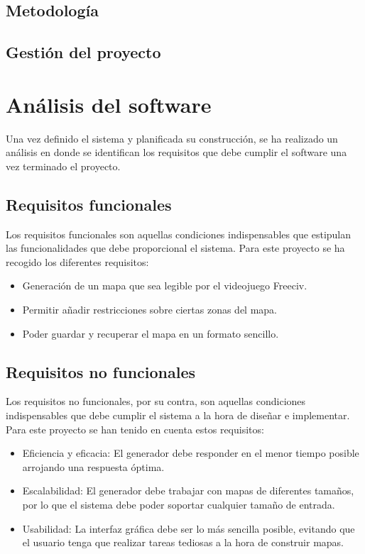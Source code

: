 \subsection{Metodología}

\subsection{Gestión del proyecto}

\section{Análisis del software}

Una vez definido el sistema y planificada su construcción, se ha realizado un análisis en donde se identifican los requisitos que debe cumplir el software una vez terminado el proyecto.

\subsection{Requisitos funcionales}

Los requisitos funcionales son aquellas condiciones indispensables que estipulan las funcionalidades que debe proporcional el sistema. Para este proyecto se ha recogido los diferentes requisitos:

\begin{itemize}
	\item Generación de un mapa que sea legible por el videojuego Freeciv.
	\item Permitir añadir restricciones sobre ciertas zonas del mapa.
	\item Poder guardar y recuperar el mapa en un formato sencillo.
\end{itemize}

\subsection{Requisitos no funcionales}

Los requisitos no funcionales, por su contra, son aquellas condiciones indispensables que debe cumplir el sistema a la hora de diseñar e implementar. Para este proyecto se han tenido en cuenta estos requisitos:

\begin{itemize}
	\item Eficiencia y eficacia: El generador debe responder en el menor tiempo posible arrojando una respuesta óptima.
	\item Escalabilidad: El generador debe trabajar con mapas de diferentes tamaños, por lo que el sistema debe poder soportar cualquier tamaño de entrada.
	\item Usabilidad: La interfaz gráfica debe ser lo más sencilla posible, evitando que el usuario tenga que realizar tareas tediosas a la hora de construir mapas.
\end{itemize}

